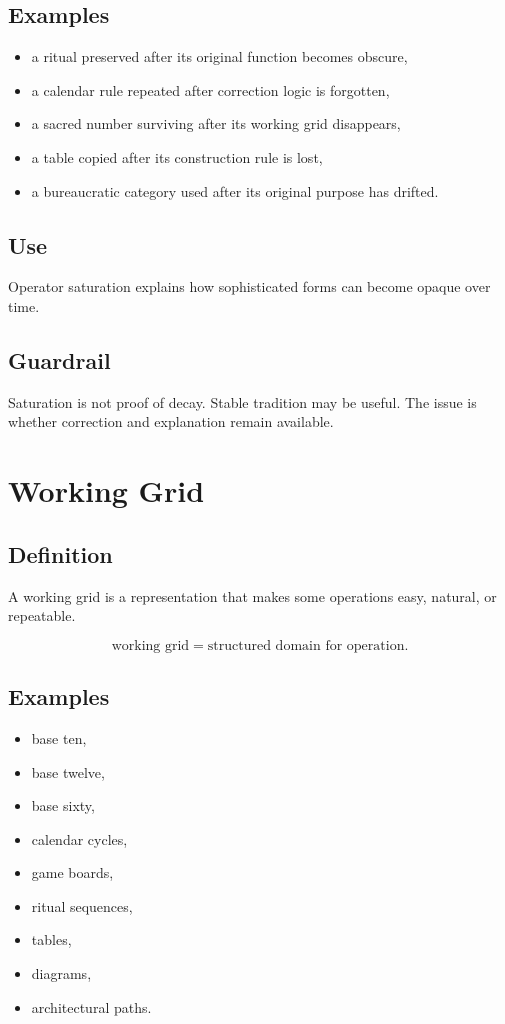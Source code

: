 \documentclass[11pt]{book}
\begin{document}
\subsection*{Examples}

\begin{itemize}
    \item a ritual preserved after its original function becomes obscure,
    \item a calendar rule repeated after correction logic is forgotten,
    \item a sacred number surviving after its working grid disappears,
    \item a table copied after its construction rule is lost,
    \item a bureaucratic category used after its original purpose has drifted.
\end{itemize}

\subsection*{Use}

Operator saturation explains how sophisticated forms can become opaque over time.

\subsection*{Guardrail}

Saturation is not proof of decay. Stable tradition may be useful. The issue is whether correction and explanation remain available.

\section{Working Grid}

\subsection*{Definition}

A working grid is a representation that makes some operations easy, natural, or repeatable.

\[
\text{working grid} = \text{structured domain for operation}.
\]

\subsection*{Examples}

\begin{itemize}
    \item base ten,
    \item base twelve,
    \item base sixty,
    \item calendar cycles,
    \item game boards,
    \item ritual sequences,
    \item tables,
    \item diagrams,
    \item architectural paths.
\end{itemize}
\end{document}
